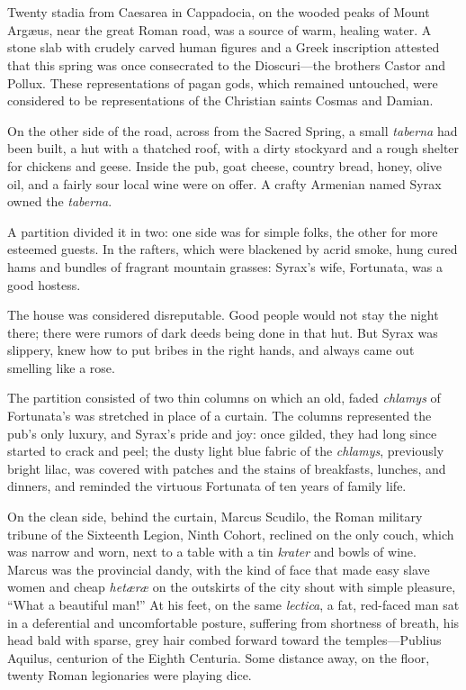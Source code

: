 \part{}

\chapter{} %

Twenty stadia from Caesarea in Cappadocia, on the wooded peaks of Mount
Arg\ae us, near the great Roman road, was a source of warm, healing
water. A stone slab with crudely carved human figures and a Greek
inscription attested that this spring was once consecrated to the
Dioscuri---the brothers Castor and Pollux. These representations of
pagan gods, which remained untouched, were considered to be
representations of the Christian saints Cosmas and Damian.

On the other side of the road, across from the Sacred Spring, a small
\textit{taberna} had been built, a hut with a thatched roof, with a
dirty stockyard and a rough shelter for chickens and geese. Inside the
pub, goat cheese, country bread, honey, olive oil, and a fairly sour
local wine were on offer. A crafty Armenian named Syrax owned the
\textit{taberna}.

A partition divided it in two: one side was for simple folks, the
other for more esteemed guests. In the rafters, which were blackened
by acrid smoke, hung cured hams and bundles of fragrant mountain
grasses: Syrax's wife, Fortunata, was a good hostess.

The house was considered disreputable. Good people would not stay
the night there; there were rumors of dark deeds being done in that
hut. But Syrax was slippery, knew how to put bribes in the right
hands, and always came out smelling like a rose.

The partition consisted of two thin columns on which an old, faded
\textit{chlamys} of Fortunata's was stretched in place of a
curtain. The columns represented the pub's only luxury, and Syrax's
pride and joy: once gilded, they had long since started to crack and
peel; the dusty light blue fabric of the \textit{chlamys}, previously
bright lilac, was covered with patches and the stains of breakfasts,
lunches, and dinners, and reminded the virtuous Fortunata of ten years
of family life.

On the clean side, behind the curtain, Marcus Scudilo, the Roman
military tribune of the Sixteenth Legion, Ninth Cohort, reclined on
the only couch, which was narrow and worn, next to a table with a tin
\textit{krater} and bowls of wine. Marcus was the provincial dandy,
with the kind of face that made easy slave women and cheap
\textit{het\ae r\ae} on the outskirts of the city shout with simple
pleasure, ``What a beautiful man!'' At his feet, on the same
\textit{lectica}, a fat, red-faced man sat in a deferential and
uncomfortable posture, suffering from shortness of breath, his head
bald with sparse, grey hair combed forward toward the
temples---Publius Aquilus, centurion of the Eighth Centuria. Some
distance away, on the floor, twenty Roman legionaries were playing dice.

